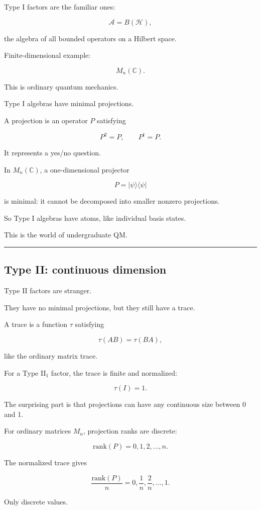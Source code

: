 \documentclass[11pt,a4paper]{article}
\begin{document}
Type I factors are the familiar ones:

\[
\mathcal{A}=B(\mathcal{H}),
\]

the algebra of all bounded operators on a Hilbert space.

Finite-dimensional example:

\[
M_n(\mathbb{C}).
\]

This is ordinary quantum mechanics.

Type I algebras have minimal projections.

A projection is an operator $P$ satisfying

\[
P^2=P,\qquad P^\dagger=P.
\]

It represents a yes/no question.

In $M_n(\mathbb{C})$, a one-dimensional projector

\[
P=|\psi\rangle\langle\psi|
\]

is minimal: it cannot be decomposed into smaller nonzero projections.

So Type I algebras have atoms, like individual basis states.

This is the world of undergraduate QM.

\medskip\hrule\medskip

\subsection{Type II: continuous dimension}

Type II factors are stranger.

They have no minimal projections, but they still have a trace.

A trace is a function $\tau$ satisfying

\[
\tau(AB)=\tau(BA),
\]

like the ordinary matrix trace.

For a Type II$_1$ factor, the trace is finite and normalized:

\[
\tau(I)=1.
\]

The surprising part is that projections can have any continuous size between 0 and 1.

For ordinary matrices $M_n$, projection ranks are discrete:

\[
\mathrm{rank}(P)=0,1,2,\dots,n.
\]

The normalized trace gives

\[
\frac{\mathrm{rank}(P)}{n}
=
0,\frac{1}{n},\frac{2}{n},\dots,1.
\]

Only discrete values.
\end{document}
